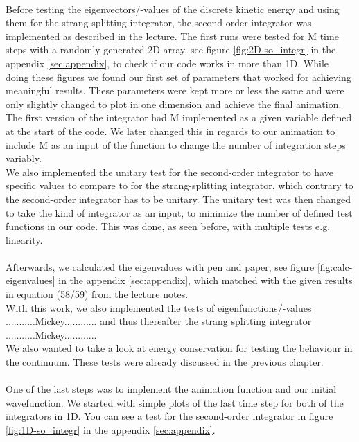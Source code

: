 \documentclass[11pt, letterpaper, onecolumn]{article}
\begin{document}
	\\
	Before testing the eigenvectors/-values of the discrete kinetic energy and using them for the strang-splitting integrator, the second-order integrator was implemented as described in the lecture. The first runs were tested for M time steps with a randomly generated 2D array, see figure \ref{fig:2D-so_integr} in the appendix \ref{sec:appendix}, to check if our code works in more than 1D. While doing these figures we found our first set of parameters that worked for achieving meaningful results. These parameters were kept more or less the same and were only slightly changed to plot in one dimension and achieve the final animation. \\
	The first version of the integrator had M implemented as a given variable defined at the start of the code. We later changed this in regards to our animation to include M as an input of the function to change the number of integration steps variably. \\
	We also implemented the unitary test for the second-order integrator to have specific values to compare to for the strang-splitting integrator, which contrary to the second-order integrator has to be unitary. The unitary test was then changed to take the kind of integrator as an input, to minimize the number of defined test functions in our code. This was done, as seen before, with multiple tests e.g. linearity.
	\\
	\\
	Afterwards, we calculated the eigenvalues with pen and paper, see figure \ref{fig:calc-eigenvalues} in the appendix \ref{sec:appendix}, which matched with the given results in equation (58/59) from the lecture notes. \\
	With this work, we also implemented the tests of eigenfunctions/-values ...........Mickey............ and thus thereafter the strang splitting integrator ...........Mickey............ \\
	We also wanted to take a look at energy conservation for testing the behaviour in the continuum. These tests were already discussed in the previous chapter.
	\\
	\\
	One of the last steps was to implement the animation function and our initial wavefunction. We started with simple plots of the last time step for both of the integrators in 1D. You can see a test for the second-order integrator in figure \ref{fig:1D-so_integr} in the appendix \ref{sec:appendix}. \\
\end{document}
